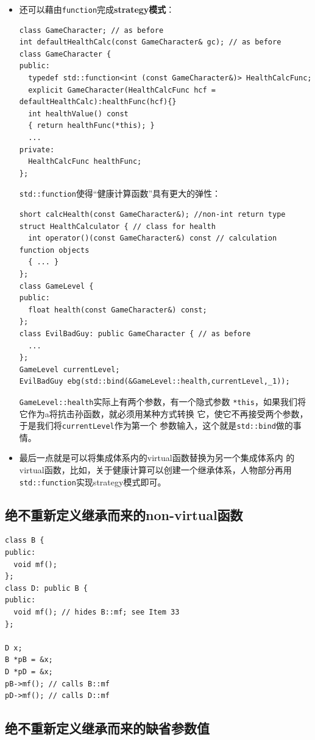 \begin{itemize}
\item 还可以藉由\texttt{function}完成\textbf{strategy模式}：
\begin{verbatim}
class GameCharacter; // as before
int defaultHealthCalc(const GameCharacter& gc); // as before
class GameCharacter {
public:
  typedef std::function<int (const GameCharacter&)> HealthCalcFunc;
  explicit GameCharacter(HealthCalcFunc hcf = defaultHealthCalc):healthFunc(hcf){}
  int healthValue() const
  { return healthFunc(*this); }
  ...
private:
  HealthCalcFunc healthFunc;
};
\end{verbatim}
  \texttt{std::function}使得“健康计算函数”具有更大的弹性：
\begin{verbatim}
short calcHealth(const GameCharacter&); //non-int return type
struct HealthCalculator { // class for health
  int operator()(const GameCharacter&) const // calculation function objects
  { ... }
};
class GameLevel {
public:
  float health(const GameCharacter&) const;
}; 
class EvilBadGuy: public GameCharacter { // as before
  ...
};
GameLevel currentLevel;
EvilBadGuy ebg(std::bind(&GameLevel::health,currentLevel,_1));
\end{verbatim}
  \texttt{GameLevel::health}实际上有两个参数，有一个隐式参数
  \texttt{*this}，如果我们将它作为a将抗击孙函数，就必须用某种方式转换
  它，使它不再接受两个参数，于是我们将\texttt{currentLevel}作为第一个
  参数输入，这个就是\texttt{std::bind}做的事情。
\item 最后一点就是可以将集成体系内的virtual函数替换为另一个集成体系内
  的virtual函数，比如，关于健康计算可以创建一个继承体系，人物部分再用
  \texttt{std::function}实现strategy模式即可。
\end{itemize}

\subsection{绝不重新定义继承而来的non-virtual函数}
\label{sec:Item-36}
\begin{verbatim}
class B {
public:
  void mf();
};
class D: public B {
public:
  void mf(); // hides B::mf; see Item 33
};

D x;
B *pB = &x;
D *pD = &x;
pB->mf(); // calls B::mf
pD->mf(); // calls D::mf
\end{verbatim}

\subsection{绝不重新定义继承而来的缺省参数值}
\label{sec:Item-37}

